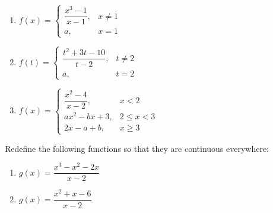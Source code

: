 \documentclass[mathNotesPreamble]{subfiles}
\begin{document}
    \begin{enumerate}[itemsep=\stretch{1}]
      \item 
        $f(x)=\begin{cases}
          \dfrac{x^3-1}{x-1},& x\neq 1\\
          a,& x=1
        \end{cases}$
      \item 
        $f(t)=\begin{cases}
          \dfrac{t^2+3t-10}{t-2},& t\neq2\\
          a,& t=2
        \end{cases}$
    \pagebreak

      \item 
        $f(x)=\begin{cases}
          \dfrac{x^2-4}{x-2},& x<2\\
          ax^2-bx+3,& 2\leq x<3\\
          2x-a+b,& x\geq 3
        \end{cases}$
    \end{enumerate}
  \begin{ex*}
    Redefine the following functions so that they are continuous everywhere:
    \begin{enumerate}[itemsep=\stretch{1}]
      \item $g(x)=\dfrac{x^3-x^2-2x}{x-2}$
      \item $g(x)=\dfrac{x^2+x-6}{x-2}$
    \end{enumerate}
  \end{ex*}
  \pagebreak
  
  
\end{document}
